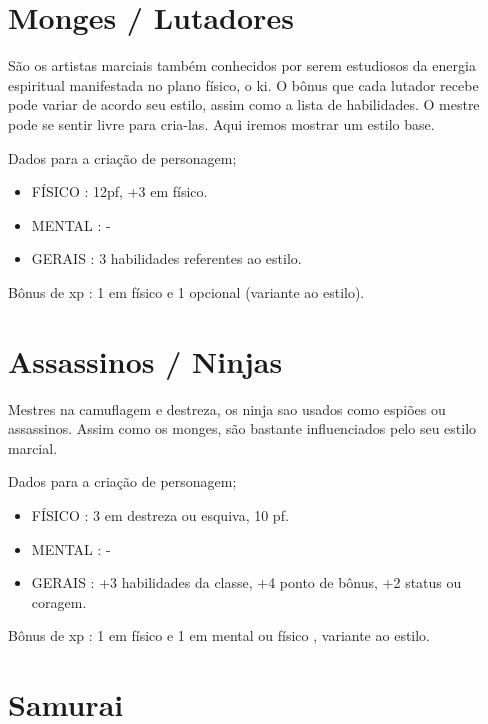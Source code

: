 \section{Monges / Lutadores}

São os artistas marciais também conhecidos por serem estudiosos da energia espiritual manifestada no plano físico, o ki. O bônus que cada lutador recebe pode variar de acordo seu estilo, assim como a lista de habilidades. O mestre pode se sentir livre para cria-las. Aqui iremos mostrar um estilo base. 
 

Dados para a criação de personagem;


\begin{itemize}

	\item FÍSICO : 12pf, +3 em físico.

	\item MENTAL : -

	\item GERAIS : 3 habilidades referentes ao estilo. 

\end{itemize}

Bônus de xp : 1 em físico e 1 opcional (variante ao estilo).

\section{Assassinos / Ninjas}

Mestres na camuflagem e destreza, os ninja sao usados como espiões ou assassinos. Assim como os monges, são bastante influenciados pelo seu estilo marcial.
 
Dados para a criação de personagem;

\begin{itemize}


	\item FÍSICO : 3 em destreza ou esquiva, 10 pf.  

	\item MENTAL : -

	\item GERAIS : +3 habilidades da classe, +4 ponto de bônus, +2 status ou coragem. 

\end{itemize}

Bônus de xp : 1 em físico e 1 em mental ou físico , variante ao estilo.


\section{Samurai}

